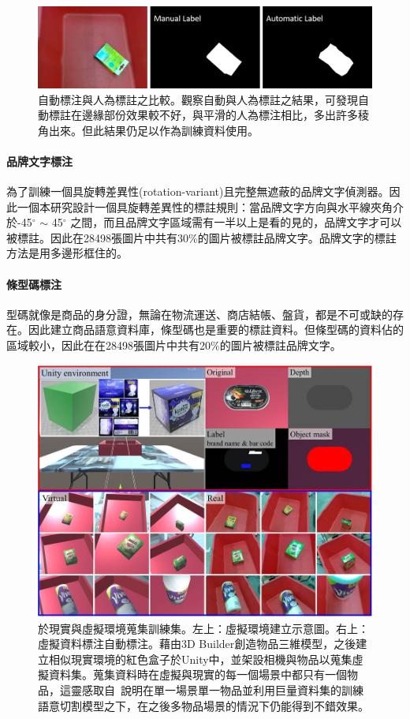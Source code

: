 \begin{figure}[ht]
	\centering
	\includegraphics[height=!, width=1.0\linewidth, keepaspectratio=true]
	{./figures/auto_object_label.png}
  \caption{自動標注與人為標註之比較。觀察自動與人為標註之結果，可發現自動標註在邊緣部份效果較不好，與平滑的人為標注相比，多出許多稜角出來。但此結果仍足以作為訓練資料使用。}
  \label{figure:auto_object_label}
\end{figure}


\paragraph{品牌文字標注}
為了訓練一個具旋轉差異性(rotation-variant)且完整無遮蔽的品牌文字偵測器。因此一個本研究設計一個具旋轉差異性的標註規則：當品牌文字方向與水平線夾角介於-45$^{\circ}$ $\sim$ 45$^{\circ}$ 之間，而且品牌文字區域需有一半以上是看的見的，品牌文字才可以被標註。因此在28498張圖片中共有30\%的圖片被標註品牌文字。品牌文字的標註方法是用多邊形框住的。

\paragraph{條型碼標注}
型碼就像是商品的身分證，無論在物流運送、商店結帳、盤貨，都是不可或缺的存在。因此建立商品語意資料庫，條型碼也是重要的標註資料。但條型碼的資料佔的區域較小，因此在在28498張圖片中共有20\%的圖片被標註品牌文字。

\begin{figure}[ht]
	\centering
	\includegraphics[height=!, width=0.8\linewidth, keepaspectratio=true]
	{./figures/real_and_vir_environment.jpg}
  \caption{於現實與虛擬環境蒐集訓練集。左上：虛擬環境建立示意圖。右上：虛擬資料標注自動標注。藉由3D Builder創造物品三維模型，之後建立相似現實環境的紅色盒子於Unity中，並架設相機與物品以蒐集虛擬資料集。蒐集資料時在虛擬與現實的每一個場景中都只有一個物品，這靈感取自~\cite{zeng2016multi}說明在單一場景單一物品並利用巨量資料集的訓練語意切割模型之下，在之後多物品場景的情況下仍能得到不錯效果。}
  \label{figure:benchmark-dataset}
\end{figure}

